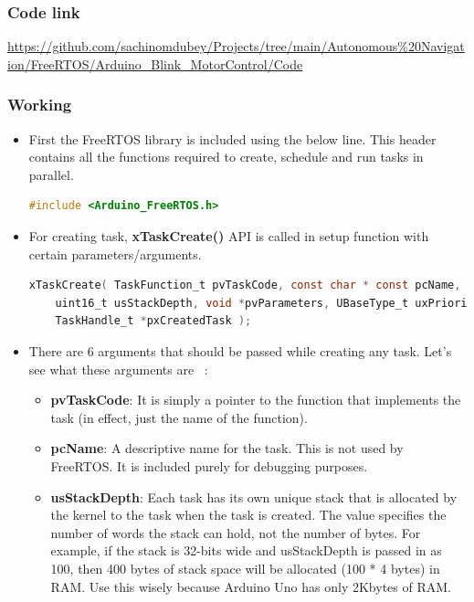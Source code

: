 \subsubsection{Code link} \label{Code_link_FreeRTOS_Arduino}
\begin{tcolorbox}
\url{https://github.com/sachinomdubey/Projects/tree/main/Autonomous\%20Navigation/FreeRTOS/Arduino_Blink_MotorControl/Code}
\end{tcolorbox}

\subsubsection{Working}
\begin{itemize}
    \item First the FreeRTOS library is included using the below line. This header contains all the functions required to create, schedule and run tasks in parallel.
    \begin{lstlisting}[language=C]
    #include <Arduino_FreeRTOS.h>
    \end{lstlisting}
    \item For creating task, \textbf{xTaskCreate()} API is called in setup function with certain parameters/arguments.
    \begin{lstlisting}[language=C]
    xTaskCreate( TaskFunction_t pvTaskCode, const char * const pcName,
    uint16_t usStackDepth, void *pvParameters, UBaseType_t uxPriority,
    TaskHandle_t *pxCreatedTask );
    \end{lstlisting}
    \item There are 6 arguments that should be passed while creating any task. Let’s see what these arguments are ~\cite{FreeRTOS_task}:
    \begin{itemize}
        \item \textbf{pvTaskCode}: It is simply a pointer to the function that implements the task (in effect, just the name of the function).
        \item \textbf{pcName}: A descriptive name for the task. This is not used by FreeRTOS. It is included purely for debugging purposes.
        \item \textbf{usStackDepth}: Each task has its own unique stack that is allocated by the kernel to the task when the task is created. The value specifies the number of words the stack can hold, not the number of bytes. For example, if the stack is 32-bits wide and usStackDepth is passed in as 100, then 400 bytes of stack space will be allocated (100 * 4 bytes) in RAM. Use this wisely because Arduino Uno has only 2Kbytes of RAM.

\end{itemize}
\end{itemize}
